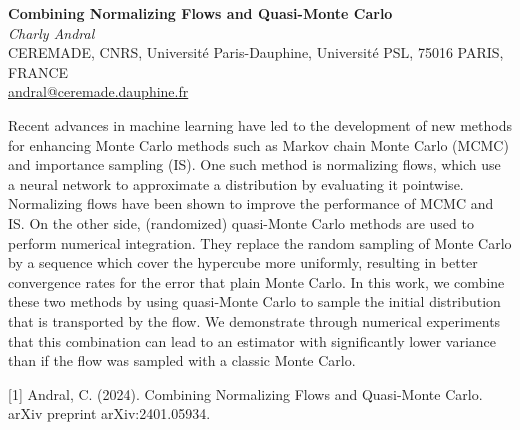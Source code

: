 \documentclass[12pt,a4paper,figuresright]{book}
\newenvironment{talk}[6]%
 {%
  \vskip 0pt\nopagebreak%
 \vskip 0pt\nopagebreak%
  \textbf{#1}\vspace{3mm}\\\nopagebreak%
  \textit{#2}\\\nopagebreak%
  #3\\\nopagebreak%
  \url{#4}\vspace{3mm}\\\nopagebreak%
  \ifthenelse{\equal{#5}{}}{}{Coauthor(s): #5\vspace{3mm}\\\nopagebreak}%
  \ifthenelse{\equal{#6}{}}{}{Special session: #6\quad \vspace{3mm}\\\nopagebreak}%
 }
 {\vspace{1cm}\\\nopagebreak}%
\begin{document}
\begin{talk}
  {Combining Normalizing Flows and Quasi-Monte Carlo}%
  {Charly Andral}%
  { CEREMADE, CNRS, Université Paris-Dauphine, Université PSL, 75016 PARIS, FRANCE}%
  {andral@ceremade.dauphine.fr}%
  {}%
  {}%

				
				

    Recent advances in machine learning have led to the development of new methods for enhancing Monte Carlo methods such as Markov chain Monte Carlo (MCMC) and importance sampling (IS). One such method is normalizing flows, which use a neural network to approximate a distribution by evaluating it pointwise. Normalizing flows have been shown to improve the performance of MCMC and IS. On the other side, (randomized) quasi-Monte Carlo methods are used to perform numerical integration. They replace the random sampling of Monte Carlo by a sequence which cover the hypercube more uniformly, resulting in better convergence rates for the error that plain Monte Carlo. In this work, we combine these two methods by using quasi-Monte Carlo to sample the initial distribution that is transported by the flow. We demonstrate through numerical experiments that this combination can lead to an estimator with significantly lower variance than if the flow was sampled with a classic Monte Carlo.

\medskip

[1] Andral, C. (2024). Combining Normalizing Flows and Quasi-Monte Carlo. arXiv preprint arXiv:2401.05934.
\end{talk}
\end{document}

